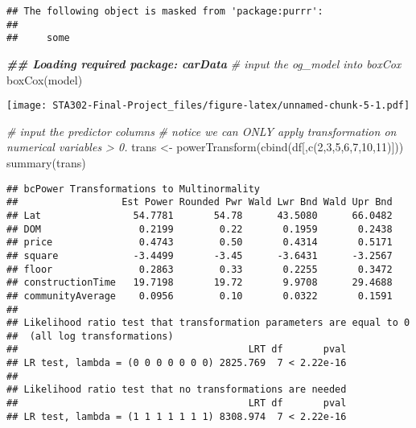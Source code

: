 \documentclass[
]{article}
\newenvironment{Shaded}{\begin{snugshade}}{\end{snugshade}}
\newcommand{\CommentTok}[1]{\textcolor[rgb]{0.56,0.35,0.01}{\textit{#1}}}
\newcommand{\DecValTok}[1]{\textcolor[rgb]{0.00,0.00,0.81}{#1}}
\newcommand{\DocumentationTok}[1]{\textcolor[rgb]{0.56,0.35,0.01}{\textbf{\textit{#1}}}}
\newcommand{\FunctionTok}[1]{\textcolor[rgb]{0.00,0.00,0.00}{#1}}
\newcommand{\NormalTok}[1]{#1}
\newcommand{\OtherTok}[1]{\textcolor[rgb]{0.56,0.35,0.01}{#1}}
\begin{document}
\begin{verbatim}
## The following object is masked from 'package:purrr':
## 
##     some
\end{verbatim}

\begin{Shaded}
\begin{Highlighting}[]
\DocumentationTok{\#\# Loading required package: carData}
\CommentTok{\# input the og\_model into boxCox}
\FunctionTok{boxCox}\NormalTok{(model)}
\end{Highlighting}
\end{Shaded}

\texttt{[image: STA302-Final-Project\_files/figure-latex/unnamed-chunk-5-1.pdf]}

\begin{Shaded}
\begin{Highlighting}[]
\CommentTok{\# input the predictor columns}
\CommentTok{\# notice we can ONLY apply transformation on numerical variables \textgreater{} 0.}
\NormalTok{trans }\OtherTok{\textless{}{-}} \FunctionTok{powerTransform}\NormalTok{(}\FunctionTok{cbind}\NormalTok{(df[,}\FunctionTok{c}\NormalTok{(}\DecValTok{2}\NormalTok{,}\DecValTok{3}\NormalTok{,}\DecValTok{5}\NormalTok{,}\DecValTok{6}\NormalTok{,}\DecValTok{7}\NormalTok{,}\DecValTok{10}\NormalTok{,}\DecValTok{11}\NormalTok{)]))}
\FunctionTok{summary}\NormalTok{(trans)}
\end{Highlighting}
\end{Shaded}

\begin{verbatim}
## bcPower Transformations to Multinormality 
##                  Est Power Rounded Pwr Wald Lwr Bnd Wald Upr Bnd
## Lat                54.7781       54.78      43.5080      66.0482
## DOM                 0.2199        0.22       0.1959       0.2438
## price               0.4743        0.50       0.4314       0.5171
## square             -3.4499       -3.45      -3.6431      -3.2567
## floor               0.2863        0.33       0.2255       0.3472
## constructionTime   19.7198       19.72       9.9708      29.4688
## communityAverage    0.0956        0.10       0.0322       0.1591
## 
## Likelihood ratio test that transformation parameters are equal to 0
##  (all log transformations)
##                                        LRT df       pval
## LR test, lambda = (0 0 0 0 0 0 0) 2825.769  7 < 2.22e-16
## 
## Likelihood ratio test that no transformations are needed
##                                        LRT df       pval
## LR test, lambda = (1 1 1 1 1 1 1) 8308.974  7 < 2.22e-16
\end{verbatim}
\end{document}
